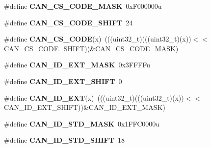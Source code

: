 \begin{DoxyCompactItemize}
\item 
\#define {\bfseries C\+A\+N\+\_\+\+C\+S\+\_\+\+C\+O\+D\+E\+\_\+\+M\+A\+SK}~0x\+F000000u\hypertarget{group__CAN__Register__Masks_gadff04787b30174d22d7955037c850b7c}{}\label{group__CAN__Register__Masks_gadff04787b30174d22d7955037c850b7c}

\item 
\#define {\bfseries C\+A\+N\+\_\+\+C\+S\+\_\+\+C\+O\+D\+E\+\_\+\+S\+H\+I\+FT}~24\hypertarget{group__CAN__Register__Masks_ga58e7e6f814f9a6f5fa03974e3f4d7e34}{}\label{group__CAN__Register__Masks_ga58e7e6f814f9a6f5fa03974e3f4d7e34}

\item 
\#define {\bfseries C\+A\+N\+\_\+\+C\+S\+\_\+\+C\+O\+DE}(x)~(((uint32\+\_\+t)(((uint32\+\_\+t)(x))$<$$<$C\+A\+N\+\_\+\+C\+S\+\_\+\+C\+O\+D\+E\+\_\+\+S\+H\+I\+FT))\&C\+A\+N\+\_\+\+C\+S\+\_\+\+C\+O\+D\+E\+\_\+\+M\+A\+SK)\hypertarget{group__CAN__Register__Masks_gadb905f9c1ab532c48d22258796f10a39}{}\label{group__CAN__Register__Masks_gadb905f9c1ab532c48d22258796f10a39}

\item 
\#define {\bfseries C\+A\+N\+\_\+\+I\+D\+\_\+\+E\+X\+T\+\_\+\+M\+A\+SK}~0x3\+F\+F\+F\+Fu\hypertarget{group__CAN__Register__Masks_gacd238d5b88bd71a60ff7c00da7427be7}{}\label{group__CAN__Register__Masks_gacd238d5b88bd71a60ff7c00da7427be7}

\item 
\#define {\bfseries C\+A\+N\+\_\+\+I\+D\+\_\+\+E\+X\+T\+\_\+\+S\+H\+I\+FT}~0\hypertarget{group__CAN__Register__Masks_gadd4a0522a5d856f631a2812cc8fe909c}{}\label{group__CAN__Register__Masks_gadd4a0522a5d856f631a2812cc8fe909c}

\item 
\#define {\bfseries C\+A\+N\+\_\+\+I\+D\+\_\+\+E\+XT}(x)~(((uint32\+\_\+t)(((uint32\+\_\+t)(x))$<$$<$C\+A\+N\+\_\+\+I\+D\+\_\+\+E\+X\+T\+\_\+\+S\+H\+I\+FT))\&C\+A\+N\+\_\+\+I\+D\+\_\+\+E\+X\+T\+\_\+\+M\+A\+SK)\hypertarget{group__CAN__Register__Masks_gaa1bc82610ef65d7579d51e493537e226}{}\label{group__CAN__Register__Masks_gaa1bc82610ef65d7579d51e493537e226}

\item 
\#define {\bfseries C\+A\+N\+\_\+\+I\+D\+\_\+\+S\+T\+D\+\_\+\+M\+A\+SK}~0x1\+F\+F\+C0000u\hypertarget{group__CAN__Register__Masks_ga35a257f1f6dd8ee576becf1f05e995c2}{}\label{group__CAN__Register__Masks_ga35a257f1f6dd8ee576becf1f05e995c2}

\item 
\#define {\bfseries C\+A\+N\+\_\+\+I\+D\+\_\+\+S\+T\+D\+\_\+\+S\+H\+I\+FT}~18\hypertarget{group__CAN__Register__Masks_gae8834f24b0aac84530ffd22f683ef5b4}{}\label{group__CAN__Register__Masks_gae8834f24b0aac84530ffd22f683ef5b4}


\end{DoxyCompactItemize}

